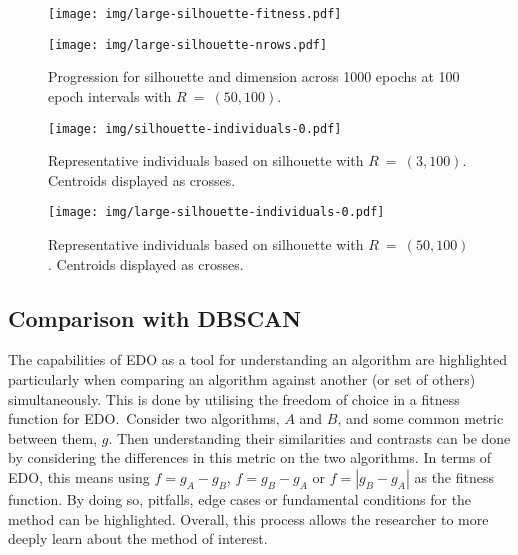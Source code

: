 \begin{figure}[htbp]
    \ContinuedFloat%
    \centering
    \begin{minipage}{\imgwidth}
        \centering
        \texttt{[image: img/large-silhouette-fitness.pdf]}
    \end{minipage}

    \begin{minipage}{\imgwidth}
        \centering
        \texttt{[image: img/large-silhouette-nrows.pdf]}
    \end{minipage}
    \caption{Progression for silhouette and dimension across 1000 epochs at 100
             epoch intervals with
             \(R~=~(50,100)\).}\label{figure:large-silhouette}
\end{figure}

\begin{figure}[htbp]
    \ContinuedFloat*
    \centering
    \texttt{[image: img/silhouette-individuals-0.pdf]}
    \caption{Representative individuals based on silhouette with
             \(R~=~(3,100)\). Centroids displayed as
             crosses.}\label{figure:silhouette-individuals}
\end{figure}

\begin{figure}[htbp]
    \ContinuedFloat%
    \centering
    \texttt{[image: img/large-silhouette-individuals-0.pdf]}
    \caption{Representative individuals based on silhouette with
             \(R~=~(50,100)\). Centroids displayed as
             crosses.}\label{figure:large-silhouette-individuals}
\end{figure}


\subsection{Comparison with DBSCAN}

The capabilities of EDO as a tool for understanding an algorithm are highlighted
particularly when comparing an algorithm against another (or set of others)
simultaneously. This is done by utilising the freedom of choice in a fitness
function for EDO.\ Consider two algorithms, \(A\) and \(B\), and some common
metric between them, \(g\). Then understanding their similarities and contrasts
can be done by considering the differences in this metric on the two algorithms.
In terms of EDO, this means using \(f = g_A - g_B\), \(f = g_B - g_A\) or \(f
= \left| g_B - g_A \right|\) as the fitness function. By doing so, pitfalls,
edge cases or fundamental conditions for the method can be highlighted.
Overall, this process allows the researcher to more deeply learn about the
method of interest.

